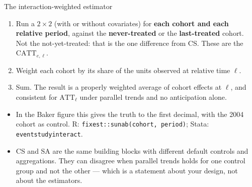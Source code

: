 \documentclass[
  11pt,
  ignorenonframetext,
  aspectratio=169,
]{beamer}
\providecommand{\tightlist}{%
  \setlength{\itemsep}{0pt}\setlength{\parskip}{0pt}}
\begin{document}
\begin{frame}[fragile]{The interaction-weighted estimator}
\protect{}\label{the-interaction-weighted-estimator}
\begin{enumerate}
\tightlist
\item
  Run a \(2 \times 2\) (with or without covariates) for \textbf{each
  cohort and each relative period}, against the \textbf{never-treated}
  or the \textbf{last-treated} cohort. Not the not-yet-treated: that is
  the one difference from CS. These are the \(\text{CATT}_{e,\ell}\).
\item
  Weight each cohort by its share of the units observed at relative time
  \(\ell\).
\item
  Sum. The result is a properly weighted average of cohort effects at
  \(\ell\), and consistent for \(\text{ATT}_\ell\) under parallel trends
  and no anticipation alone.
\end{enumerate}

\vspace{0.3em}

\begin{itemize}
\tightlist
\item
  In the Baker figure this gives the truth to the first decimal, with
  the 2004 cohort as control. R:
  \texttt{fixest::sunab(cohort,\ period)}; Stata:
  \texttt{eventstudyinteract}.
\item
  CS and SA are the same building blocks with different default controls
  and aggregations. They can disagree when parallel trends holds for one
  control group and not the other --- which is a statement about your
  design, not about the estimators.
\end{itemize}
\end{frame}
\end{document}
